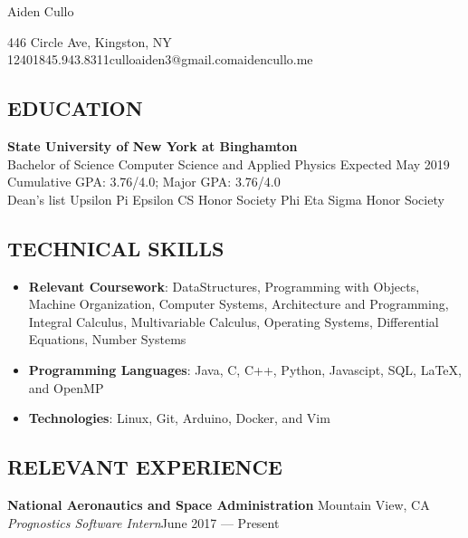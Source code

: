 \documentclass[11pt]{article}
\begin{document}
\centerline{\Huge Aiden Cullo}
\vspace{5mm}
\centerline{\small446 Circle Ave, Kingston, NY 12401\hspace{2mm}\textbar\hspace{2mm}845.943.8311\hspace{2mm}\textbar\hspace{2mm}culloaiden3@gmail.com\hspace{2mm}\textbar\hspace{2mm}aidencullo.me}
\vspace{4mm}
\subsection*{EDUCATION}
\vspace{1mm}
\spacedhrule{0.1em}{0.9em}
\textbf{State University of New York at Binghamton} \\ 
Bachelor of Science Computer Science and Applied Physics Expected May 2019 \\
Cumulative GPA: 3.76/4.0;  Major GPA: 3.76/4.0\\
Dean's list\sbull 
Upsilon Pi Epsilon CS Honor Society\sbull 
Phi Eta Sigma Honor Society \\

\vspace{4mm}
\subsection*{TECHNICAL SKILLS}
\vspace{1mm}
\spacedhrule{0.1em}{0.9em}
\begin{itemize}
  \item \textbf{Relevant Coursework}: DataStructures, Programming with Objects, Machine Organization, Computer Systems, Architecture and Programming, Integral Calculus, Multivariable Calculus, Operating Systems, Differential Equations, Number Systems
  \item	\textbf{Programming Languages}: Java, C, C++, Python, Javascipt, SQL, \LaTeX, and OpenMP
  \item \textbf{Technologies}: Linux, Git, Arduino, Docker, and Vim
\end{itemize}
\vspace{4mm}
\subsection*{RELEVANT EXPERIENCE}
\vspace{1mm}
\spacedhrule{0.1em}{0.9em}
\textbf{National Aeronautics and Space Administration\hfill} Mountain View, CA 
\textit{Prognostics Software Intern}\hfill June 2017 — Present
\end{document}
